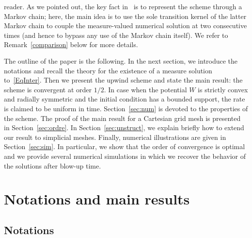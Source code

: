reader. As we pointed out, the key fact in~\cite{DLV} is to represent the scheme through a Markov chain; here, the main idea is to use the sole transition kernel of the latter Markov chain to couple the measure-valued numerical solution at two consecutive times (and hence to bypass any use of the Markov chain itself). We refer to Remark~\ref{comparison} below for more details.

The outline of the paper is the following. In the next section, we introduce the notations and recall the theory for the existence of a measure solution to~\eqref{EqInter}. Then we present the upwind scheme and state the main result: the scheme is convergent at order $1/2$. In case when the potential $W$ is strictly convex and radially symmetric and the initial condition has a bounded support, the rate is claimed to be uniform in time. Section~\ref{sec:num} is devoted to the properties of the scheme. The proof of the main result for a Cartesian grid mesh is presented in Section~\ref{sec:ordre}. In Section~\ref{sec:unstruct}, we explain briefly how to extend our result to simplicial meshes. Finally, numerical illustrations are given in Section~\ref{sec:sim}. In particular, we show that the order of convergence is optimal and we provide several numerical simulations in which we recover the behavior of the solutions after blow-up time.



\section{Notations and main results}


\subsection{Notations}

